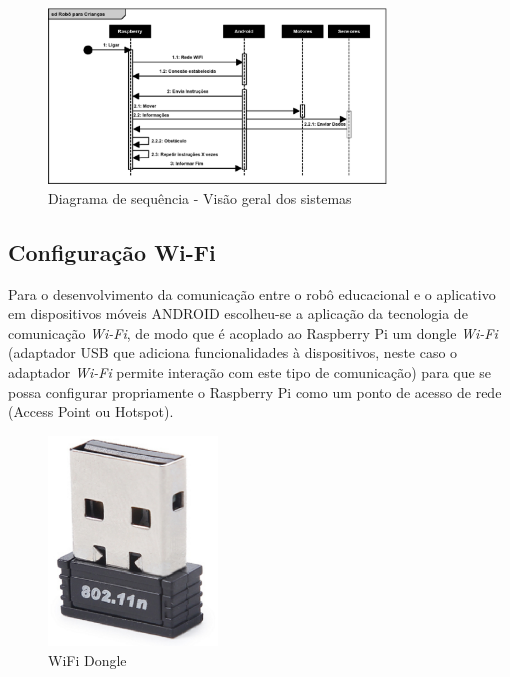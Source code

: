 \begin{figure}[H]
    \centering
    \includegraphics[width=0.8\textwidth]{figuras/diagrama_de_sequencia.eps}
    \caption{Diagrama de sequência - Visão geral dos sistemas}
    \label{fig:sequencia}
\end{figure}

\subsection{Configuração Wi-Fi}

Para o desenvolvimento da comunicação entre o robô educacional e o aplicativo em dispositivos móveis ANDROID escolheu-se a aplicação da
tecnologia de comunicação \textit{Wi-Fi}, de modo que é acoplado ao Raspberry Pi um dongle \textit{Wi-Fi} (adaptador USB que adiciona funcionalidades à
dispositivos, neste caso o adaptador \textit{Wi-Fi} permite interação com este tipo de comunicação) para que se possa configurar propriamente o
Raspberry Pi como um ponto de acesso de rede (Access Point ou Hotspot).

\begin{figure}[H]
    \centering
    \includegraphics[width=0.4\textwidth]{figuras/adaptador_wifi.eps}
    \caption{WiFi Dongle}
    \label{fig:wireless}
\end{figure}

